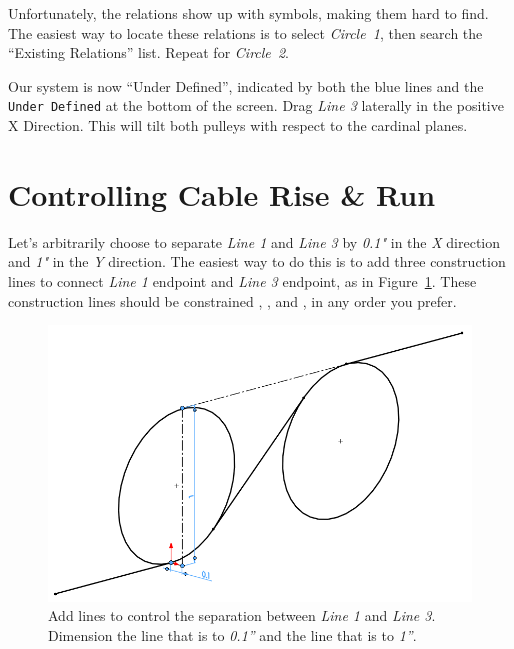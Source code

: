 Unfortunately, the  relations show up with
 symbols, making them hard to find. The easiest way to
locate these relations is to select \emph{Circle~1}, then search the ``Existing
Relations'' list. Repeat for \emph{Circle~2}.

Our system is now ``Under Defined'', indicated by both the blue lines and the
\texttt{Under~Defined} at the bottom of the screen.
Drag \emph{Line 3} laterally in the positive X Direction. This will tilt both pulleys with respect to the cardinal planes.

\section{Controlling Cable Rise \& Run}
\label{sec:cable-rise-run}

Let's arbitrarily choose to separate \emph{Line 1} and \emph{Line 3} by \emph{0.1"} in
the \emph{X} direction and \emph{1"} in the \emph{Y} direction. The easiest way to do this
is to add three construction lines to connect \emph{Line 1} endpoint and
\emph{Line 3} endpoint, as in
Figure~\ref{fig:pulley-tilt-lines}. These construction lines should be
constrained , , and , in
any order you prefer.

\begin{figure}[H]
\begin{center}
  \includegraphics[width=5in]{images/figures/pulley-tilt-lines.png}
\end{center}
\caption{Add lines to control the separation between \emph{Line 1} and \emph{Line 3}.
Dimension the line that is  to \emph{0.1''} and the line that is
 to \emph{1''}.
\label{fig:pulley-tilt-lines}}

\end{figure}

